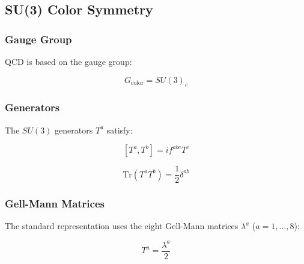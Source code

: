 \subsection{SU(3) Color Symmetry}

\subsubsection{Gauge Group}

QCD is based on the gauge group:

\begin{equation}
\label{eq:canonical:su3_group}
G_{\text{color}} = SU(3)_c
\end{equation}

\subsubsection{Generators}

The $SU(3)$ generators $T^a$ satisfy:

\begin{equation}
\label{eq:canonical:su3_commutator}
[T^a, T^b] = i f^{abc} T^c
\end{equation}

\begin{equation}
\label{eq:canonical:su3_normalization}
\text{Tr}(T^a T^b) = \frac{1}{2}\delta^{ab}
\end{equation}

\subsubsection{Gell-Mann Matrices}

The standard representation uses the eight Gell-Mann matrices $\lambda^a$ ($a=1,\ldots,8$):

\begin{equation}
T^a = \frac{\lambda^a}{2}
\end{equation}

